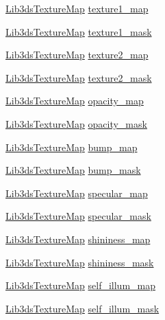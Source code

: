 \begin{DoxyCompactItemize}
\item 
\hyperlink{struct_lib3ds_texture_map}{Lib3ds\-Texture\-Map} \hyperlink{struct_lib3ds_material_a9a79faa2ba81a32506788f71b81c9ca7}{texture1\-\_\-map}
\item 
\hyperlink{struct_lib3ds_texture_map}{Lib3ds\-Texture\-Map} \hyperlink{struct_lib3ds_material_ac861a2d1c7cb512e16ffbf4c29088433}{texture1\-\_\-mask}
\item 
\hyperlink{struct_lib3ds_texture_map}{Lib3ds\-Texture\-Map} \hyperlink{struct_lib3ds_material_a289a95b96b1acc5b36211dc063c3ba4c}{texture2\-\_\-map}
\item 
\hyperlink{struct_lib3ds_texture_map}{Lib3ds\-Texture\-Map} \hyperlink{struct_lib3ds_material_a5b57fdc9ce68696f2d816133707a2487}{texture2\-\_\-mask}
\item 
\hyperlink{struct_lib3ds_texture_map}{Lib3ds\-Texture\-Map} \hyperlink{struct_lib3ds_material_ae7ad0889da544ee72df0b7702ee29d4e}{opacity\-\_\-map}
\item 
\hyperlink{struct_lib3ds_texture_map}{Lib3ds\-Texture\-Map} \hyperlink{struct_lib3ds_material_acd8e2fa50844e83f192fe0958a2a0333}{opacity\-\_\-mask}
\item 
\hyperlink{struct_lib3ds_texture_map}{Lib3ds\-Texture\-Map} \hyperlink{struct_lib3ds_material_a7cf64027d4b7a1be60d3033a62446227}{bump\-\_\-map}
\item 
\hyperlink{struct_lib3ds_texture_map}{Lib3ds\-Texture\-Map} \hyperlink{struct_lib3ds_material_a93bf68d557ecbce639cbe2442e29a4e9}{bump\-\_\-mask}
\item 
\hyperlink{struct_lib3ds_texture_map}{Lib3ds\-Texture\-Map} \hyperlink{struct_lib3ds_material_a865e55ffb621f4b42239f674704505a3}{specular\-\_\-map}
\item 
\hyperlink{struct_lib3ds_texture_map}{Lib3ds\-Texture\-Map} \hyperlink{struct_lib3ds_material_a9f04eb1b061b5b05468c0ed05d3c87a7}{specular\-\_\-mask}
\item 
\hyperlink{struct_lib3ds_texture_map}{Lib3ds\-Texture\-Map} \hyperlink{struct_lib3ds_material_a8db83046874d085ba7c491d7ba0aaef8}{shininess\-\_\-map}
\item 
\hyperlink{struct_lib3ds_texture_map}{Lib3ds\-Texture\-Map} \hyperlink{struct_lib3ds_material_ab13f224b864f2fbbec9f0099f20cae58}{shininess\-\_\-mask}
\item 
\hyperlink{struct_lib3ds_texture_map}{Lib3ds\-Texture\-Map} \hyperlink{struct_lib3ds_material_a913eab86fb3945386a8a95fe58c8a70d}{self\-\_\-illum\-\_\-map}
\item 
\hyperlink{struct_lib3ds_texture_map}{Lib3ds\-Texture\-Map} \hyperlink{struct_lib3ds_material_a96ce35b6403f418862ea510d70b4a272}{self\-\_\-illum\-\_\-mask}

\end{DoxyCompactItemize}

